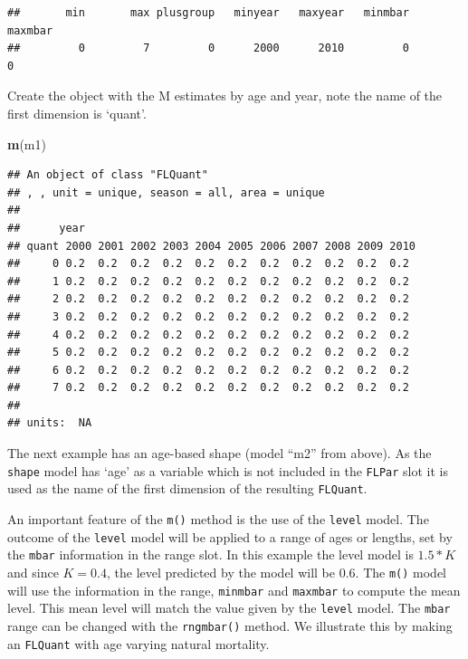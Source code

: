 \documentclass[
]{book}
\newenvironment{Shaded}{\begin{snugshade}}{\end{snugshade}}
\newcommand{\FunctionTok}[1]{\textcolor[rgb]{0.13,0.29,0.53}{\textbf{#1}}}
\newcommand{\NormalTok}[1]{#1}
\begin{document}
\begin{verbatim}
##       min       max plusgroup   minyear   maxyear   minmbar   maxmbar 
##         0         7         0      2000      2010         0         0
\end{verbatim}

Create the object with the M estimates by age and year, note the name of the first dimension is `quant'.

\begin{Shaded}
\begin{Highlighting}[]
\FunctionTok{m}\NormalTok{(m1)}
\end{Highlighting}
\end{Shaded}

\begin{verbatim}
## An object of class "FLQuant"
## , , unit = unique, season = all, area = unique
## 
##      year
## quant 2000 2001 2002 2003 2004 2005 2006 2007 2008 2009 2010
##     0 0.2  0.2  0.2  0.2  0.2  0.2  0.2  0.2  0.2  0.2  0.2 
##     1 0.2  0.2  0.2  0.2  0.2  0.2  0.2  0.2  0.2  0.2  0.2 
##     2 0.2  0.2  0.2  0.2  0.2  0.2  0.2  0.2  0.2  0.2  0.2 
##     3 0.2  0.2  0.2  0.2  0.2  0.2  0.2  0.2  0.2  0.2  0.2 
##     4 0.2  0.2  0.2  0.2  0.2  0.2  0.2  0.2  0.2  0.2  0.2 
##     5 0.2  0.2  0.2  0.2  0.2  0.2  0.2  0.2  0.2  0.2  0.2 
##     6 0.2  0.2  0.2  0.2  0.2  0.2  0.2  0.2  0.2  0.2  0.2 
##     7 0.2  0.2  0.2  0.2  0.2  0.2  0.2  0.2  0.2  0.2  0.2 
## 
## units:  NA
\end{verbatim}

The next example has an age-based shape (model ``m2'' from above). As the \texttt{shape} model has `age' as a variable which is not included in the \texttt{FLPar} slot it is used as the name of the first dimension of the resulting \texttt{FLQuant}.

An important feature of the \texttt{m()} method is the use of the \texttt{level} model. The outcome of the \texttt{level} model will be applied to a range of ages or lengths, set by the \texttt{mbar} information in the range slot. In this example the level model is \(1.5*K\) and since \(K=0.4\), the level predicted by the model will be \(0.6\). The \texttt{m()} model will use the information in the range, \texttt{minmbar} and \texttt{maxmbar} to compute the mean level. This mean level will match the value given by the \texttt{level} model. The \texttt{mbar} range can be changed with the \texttt{rngmbar()} method. We illustrate this by making an \texttt{FLQuant} with age varying natural mortality.
\end{document}
